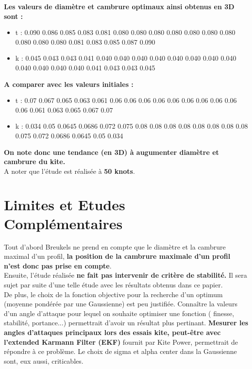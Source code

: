 \documentclass[conference]{IEEEtran}
\begin{document}
\textbf{Les valeurs de diamètre et cambrure optimaux ainsi obtenus en 3D sont : 
}

\begin{itemize}
    \item t : 0.090 0.086 0.085 0.083 0.081 0.080 0.080  0.080 0.080 0.080 0.080  0.080 0.080 0.080 0.080 0.081 0.083 0.085 0.087 0.090
    \item k : 0.045 0.043 0.043 0.041 0.040 0.040 0.040  0.040 0.040 0.040 0.040 0.040 0.040 0.040  0.040 0.040 0.041 0.043 0.043 0.045
\end{itemize}

\textbf{A comparer avec les valeurs initiales :}
\begin{itemize}
    \item t : 0.07 0.067 0.065 0.063 0.061 0.06 0.06  0.06 0.06 0.06  0.06  0.06 0.06 0.06  0.06 0.061 0.063 0.065 0.067 0.07
    \item k : 0.034 0.05 0.0645 0.0686 0.072 0.075 0.08 0.08 0.08 0.08 0.08 0.08 0.08 0.08 0.075 0.072 0.0686 0.0645 0.05 0.034
\end{itemize}

\textbf{On note donc une tendance (en 3D) à augumenter diamètre et cambrure du kite. }\\
A noter que l'étude est réalisée à \textbf{50 knots}. 

\section{ Limites et Etudes Complémentaires}

Tout d'abord Breukels ne prend en compte que le diamètre et la cambrure maximal d'un profil, \textbf{la position de la cambrure maximale d'un profil n'est donc pas prise en compte}. \\

Ensuite, l'étude réalisée \textbf{ne fait pas intervenir de critère de stabilité.} Il sera sujet par suite d'une telle étude avec les résultats obtenus dans ce papier.\\

De plus, le choix de la fonction objective pour la recherche d'un optimum (moyenne pondérée par une Gaussienne) est peu justifiée. Connaître la valeurs d'un angle d'attaque pour lequel on souhaite optimiser une fonction ( finesse, stabilité, portance...) permettrait d'avoir un résultat plus pertinant. \textbf{Mesurer les angles d'attaques principaux lors des essais kite, peut-être avec l'extended Karmann Filter (EKF)} fournit par Kite Power, permettrait de répondre à ce problème. Le choix de sigma et alpha center dans la Gaussienne sont, eux aussi, criticables.\\
\end{document}
